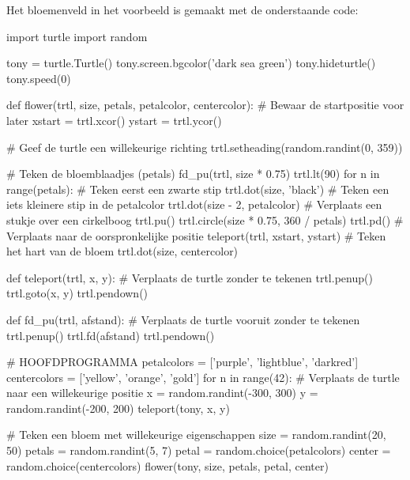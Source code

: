 \documentclass[../main]{subfiles}
\begin{document}
\begin{antwoord}
Het bloemenveld in het voorbeeld is gemaakt met de onderstaande code:
\begin{python-breakable}[style=mu-noframe, aboveskip=.5\baselineskip]
import turtle
import random

tony = turtle.Turtle()
tony.screen.bgcolor('dark sea green')
tony.hideturtle()
tony.speed(0)

def flower(trtl, size, petals, petalcolor, centercolor):
    # Bewaar de startpositie voor later
    xstart = trtl.xcor()
    ystart = trtl.ycor()

    # Geef de turtle een willekeurige richting 
    trtl.setheading(random.randint(0, 359))

    # Teken de bloemblaadjes (petals)
    fd_pu(trtl, size * 0.75)
    trtl.lt(90)
    for n in range(petals):
        # Teken eerst een zwarte stip
        trtl.dot(size, 'black')
        # Teken een iets kleinere stip in de petalcolor
        trtl.dot(size - 2, petalcolor)
        # Verplaats een stukje over een cirkelboog
        trtl.pu()
        trtl.circle(size * 0.75, 360 / petals)
        trtl.pd()
    # Verplaats naar de oorspronkelijke positie
    teleport(trtl, xstart, ystart)
    # Teken het hart van de bloem
    trtl.dot(size, centercolor)
    
def teleport(trtl, x, y):
    # Verplaats de turtle zonder te tekenen
    trtl.penup()
    trtl.goto(x, y)
    trtl.pendown()
    
def fd_pu(trtl, afstand):
    # Verplaats de turtle vooruit zonder te tekenen
    trtl.penup()
    trtl.fd(afstand)
    trtl.pendown()
        
# HOOFDPROGRAMMA
petalcolors = ['purple', 'lightblue', 'darkred']
centercolors = ['yellow', 'orange', 'gold']
for n in range(42):
    # Verplaats de turtle naar een willekeurige positie
    x = random.randint(-300, 300)
    y = random.randint(-200, 200)
    teleport(tony, x, y)

    # Teken een bloem met willekeurige eigenschappen
    size = random.randint(20, 50)
    petals = random.randint(5, 7)
    petal = random.choice(petalcolors)
    center = random.choice(centercolors)
    flower(tony, size, petals, petal, center)
\end{python-breakable}
\end{antwoord}
\end{document}
